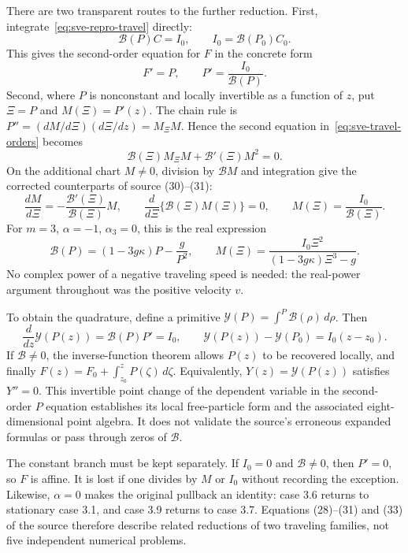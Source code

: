 \documentclass[11pt]{article}
\theoremstyle{definition}
\begin{document}
There are two transparent routes to the further reduction. First,
integrate~\eqref{eq:sve-repro-travel} directly:
\[
 \mathcal B(P)C=I_0,\qquad I_0=\mathcal B(P_0)C_0.
\]
This gives the second-order equation for $F$ in the concrete form
\begin{equation}
 F'=P,\qquad P'=\frac{I_0}{\mathcal B(P)}.
 \label{eq:sve-travel-two-state}
\end{equation}
Second, where $P$ is nonconstant and locally invertible as a function of
$z$, put $\Xi=P$ and $M(\Xi)=P'(z)$. The chain rule is
$P''=(dM/d\Xi)(d\Xi/dz)=M_\Xi M$. Hence the second equation
in~\eqref{eq:sve-travel-orders} becomes
\[
 \mathcal B(\Xi)M_\Xi M+\mathcal B'(\Xi)M^2=0.
\]
On the additional chart $M\ne0$, division by $\mathcal B M$ and integration give
the corrected counterparts of source (30)--(31):
\begin{equation}
 \frac{dM}{d\Xi}=-\frac{\mathcal B'(\Xi)}{\mathcal B(\Xi)}M,
 \qquad \frac{d}{d\Xi}\{\mathcal B(\Xi)M(\Xi)\}=0,
 \qquad M(\Xi)=\frac{I_0}{\mathcal B(\Xi)}.
 \label{eq:sve-travel-further}
\end{equation}
For $m=3$, $\alpha=-1$, $\alpha_3=0$, this is the real expression
\[
 \mathcal B(P)=(1-3g\kappa)P-\frac g{P^2},\qquad
 M(\Xi)=\frac{I_0\Xi^2}{(1-3g\kappa)\Xi^3-g}.
\]
No complex power of a negative traveling speed is needed: the real-power
argument throughout was the positive velocity $v$.

To obtain the quadrature, define a primitive
$\mathcal Y(P)=\int^P \mathcal B(\rho)\,d\rho$. Then
\[
 \frac{d}{dz}\mathcal Y(P(z))=\mathcal B(P)P'=I_0,\qquad
 \mathcal Y(P(z))-\mathcal Y(P_0)=I_0(z-z_0).
\]
If $\mathcal B\ne0$, the inverse-function theorem allows $P(z)$ to be recovered
locally, and finally $F(z)=F_0+\int_{z_0}^zP(\zeta)\,d\zeta$.
Equivalently, $Y(z)=\mathcal Y(P(z))$ satisfies $Y''=0$.
This invertible point change of the dependent variable in the
second-order $P$ equation establishes its local free-particle form and
the associated eight-dimensional point algebra. It does not validate the
source's erroneous expanded formulas or pass through zeros of $\mathcal B$.

The constant branch must be kept separately. If $I_0=0$ and $\mathcal B\ne0$,
then $P'=0$, so $F$ is affine. It is lost if one divides by $M$ or $I_0$
without recording the exception. Likewise, $\alpha=0$ makes the
original pullback an identity: case 3.6 returns to stationary case 3.1,
and case 3.9 returns to case 3.7. Equations (28)--(31) and (33) of the
source therefore describe related reductions of two traveling families,
not five independent numerical problems.
\end{document}
